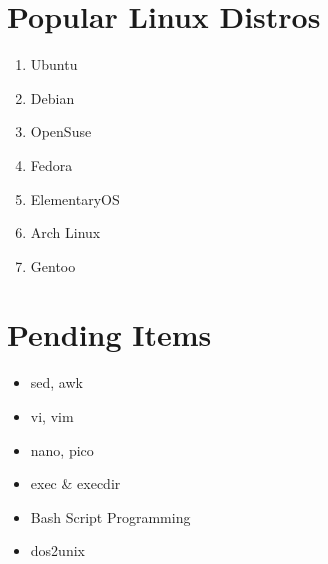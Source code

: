 \documentclass{article}
\begin{document}
\section{Popular Linux Distros}
\begin{enumerate}
	\item Ubuntu
	\item Debian
	\item OpenSuse
	\item Fedora
	\item ElementaryOS
	\item Arch Linux
	\item Gentoo
\end{enumerate}


\section{Pending Items}
\begin{itemize}
	\item sed, awk
	\item vi, vim
	\item nano, pico
	\item exec \& execdir
	\item Bash Script Programming
	\item dos2unix
\end{itemize}
\end{document}
